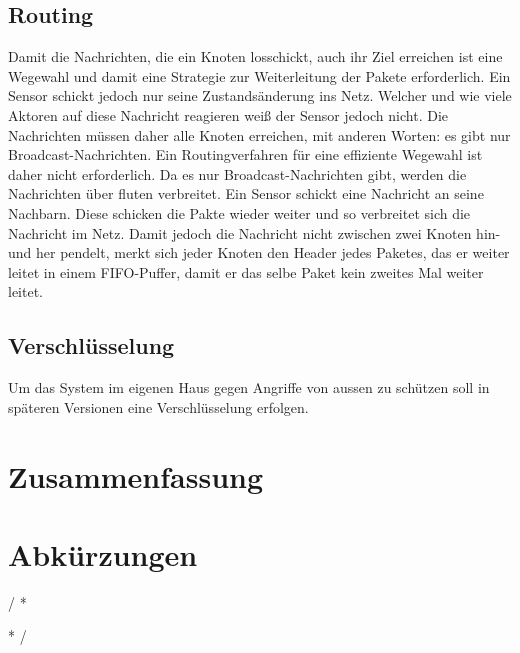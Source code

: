 \documentclass{IEEEtran}
\begin{document}
    \subsection{Routing}
        Damit die Nachrichten, die ein Knoten losschickt, auch ihr Ziel 
        erreichen ist eine Wegewahl und damit eine Strategie zur Weiterleitung 
        der Pakete erforderlich. Ein Sensor schickt jedoch nur seine 
        Zustandsänderung ins Netz. Welcher und wie viele Aktoren auf diese 
        Nachricht reagieren weiß der Sensor jedoch nicht. Die Nachrichten müssen 
        daher alle Knoten erreichen, mit anderen Worten: es gibt nur 
        Broadcast-Nachrichten. Ein Routingverfahren für eine effiziente Wegewahl 
        ist daher nicht erforderlich.
        Da es nur Broadcast-Nachrichten gibt, werden die Nachrichten über fluten 
        verbreitet. Ein Sensor schickt eine Nachricht an seine Nachbarn. Diese 
        schicken die Pakte wieder weiter und so verbreitet sich die Nachricht im 
        Netz. Damit jedoch die Nachricht nicht zwischen zwei Knoten hin- und 
        her pendelt, merkt sich jeder Knoten den Header jedes Paketes, das er 
        weiter leitet in einem FIFO-Puffer, damit er das selbe Paket kein 
        zweites Mal weiter leitet.
        

    \subsection{Verschlüsselung}
    Um das System im eigenen Haus gegen Angriffe von aussen zu schützen soll in 
    späteren Versionen eine Verschlüsselung erfolgen. 





\section{Zusammenfassung}


\section*{Abkürzungen}
\renewcommand{\IEEEiedlistdecl}{\IEEEsetlabelwidth{CSMA/CA}}
\begin{acronym}
\end{acronym}
\renewcommand{\IEEEiedlistdecl}{\relax}%


\comment / *
\listoffigures
\clearpage

\listoftables
\clearpage
* /



\end{document}
